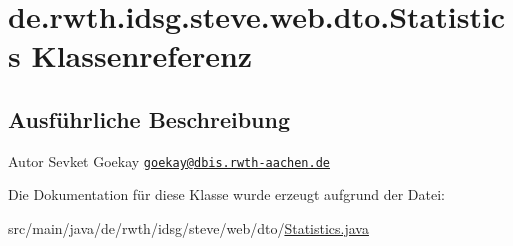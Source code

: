 \hypertarget{classde_1_1rwth_1_1idsg_1_1steve_1_1web_1_1dto_1_1_statistics}{\section{de.\-rwth.\-idsg.\-steve.\-web.\-dto.\-Statistics Klassenreferenz}
\label{classde_1_1rwth_1_1idsg_1_1steve_1_1web_1_1dto_1_1_statistics}
}


\subsection{Ausführliche Beschreibung}
\begin{DoxyAuthor}{Autor}
Sevket Goekay \href{mailto:goekay@dbis.rwth-aachen.de}{\tt goekay@dbis.\-rwth-\/aachen.\-de} 
\end{DoxyAuthor}


Die Dokumentation für diese Klasse wurde erzeugt aufgrund der Datei\-:\begin{DoxyCompactItemize}
\item 
src/main/java/de/rwth/idsg/steve/web/dto/\hyperlink{_statistics_8java}{Statistics.\-java}\end{DoxyCompactItemize}

